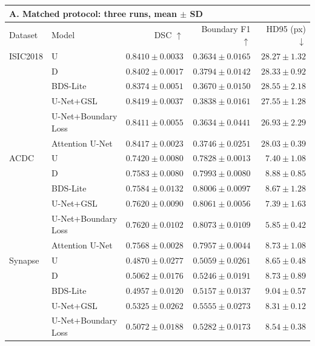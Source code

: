 \begin{tabular}{llrrr}
\toprule
\multicolumn{5}{l}{\textbf{A. Matched protocol: three runs, mean $\pm$ SD}} \\
\midrule
Dataset & Model & DSC $\uparrow$ & Boundary F1 $\uparrow$ & HD95 (px) $\downarrow$ \\
\midrule
ISIC2018 & U & $0.8410 \pm 0.0033$ & $0.3634 \pm 0.0165$ & $28.27 \pm 1.32$ \\
 & D & $0.8402 \pm 0.0017$ & $0.3794 \pm 0.0142$ & $28.33 \pm 0.92$ \\
 & BDS-Lite & $0.8374 \pm 0.0051$ & $0.3670 \pm 0.0150$ & $28.55 \pm 2.18$ \\
 & U-Net+GSL & $0.8419 \pm 0.0037$ & $0.3838 \pm 0.0161$ & $27.55 \pm 1.28$ \\
 & U-Net+Boundary Loss & $0.8411 \pm 0.0055$ & $0.3634 \pm 0.0441$ & $26.93 \pm 2.29$ \\
 & Attention U-Net & $0.8417 \pm 0.0023$ & $0.3746 \pm 0.0251$ & $28.03 \pm 0.39$ \\
\addlinespace
ACDC & U & $0.7420 \pm 0.0080$ & $0.7828 \pm 0.0013$ & $7.40 \pm 1.08$ \\
 & D & $0.7583 \pm 0.0080$ & $0.7993 \pm 0.0080$ & $8.88 \pm 0.85$ \\
 & BDS-Lite & $0.7584 \pm 0.0132$ & $0.8006 \pm 0.0097$ & $8.67 \pm 1.28$ \\
 & U-Net+GSL & $0.7620 \pm 0.0090$ & $0.8061 \pm 0.0056$ & $7.39 \pm 1.63$ \\
 & U-Net+Boundary Loss & $0.7620 \pm 0.0102$ & $0.8073 \pm 0.0109$ & $5.85 \pm 0.42$ \\
 & Attention U-Net & $0.7568 \pm 0.0028$ & $0.7957 \pm 0.0044$ & $8.73 \pm 1.08$ \\
\addlinespace
Synapse & U & $0.4870 \pm 0.0277$ & $0.5059 \pm 0.0261$ & $8.65 \pm 0.48$ \\
 & D & $0.5062 \pm 0.0176$ & $0.5246 \pm 0.0191$ & $8.73 \pm 0.89$ \\
 & BDS-Lite & $0.4957 \pm 0.0120$ & $0.5157 \pm 0.0137$ & $9.04 \pm 0.57$ \\
 & U-Net+GSL & $0.5325 \pm 0.0262$ & $0.5555 \pm 0.0273$ & $8.31 \pm 0.12$ \\
 & U-Net+Boundary Loss & $0.5072 \pm 0.0188$ & $0.5282 \pm 0.0173$ & $8.54 \pm 0.38$ \\

\end{tabular}
